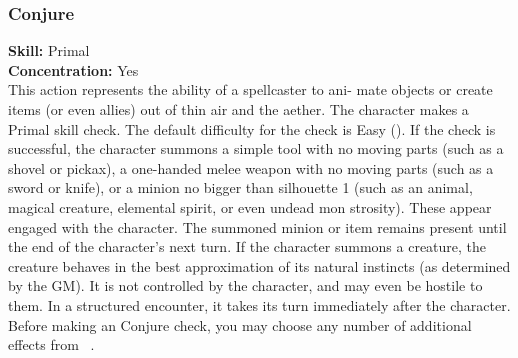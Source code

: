 \subsubsection{Conjure}
\textbf{Skill:} Primal\\
\textbf{Concentration:} Yes\\
This action represents the ability of a spellcaster to ani-
mate objects or create items (or even allies) out of thin
air and the aether. The character makes a
Primal skill check. The default difficulty for the check is
Easy (\difficulty). If the check is successful, the character
summons a simple tool with no moving parts (such as a
shovel or pickax), a one-handed melee weapon with no
moving parts (such as a sword or knife), or a minion
no bigger than silhouette 1 (such as an animal, magical
creature, elemental spirit, or even undead mon
strosity). These appear engaged with the character. The
summoned minion or item remains present until the
end of the character’s next turn.
If the character summons a creature, the creature
behaves in the best approximation of its natural instincts
(as determined by the GM). It is not controlled by the
character, and may even be hostile to them. In a structured
encounter, it takes its turn immediately after the character.
Before making an Conjure check, you may choose any number of
additional effects from ~.
